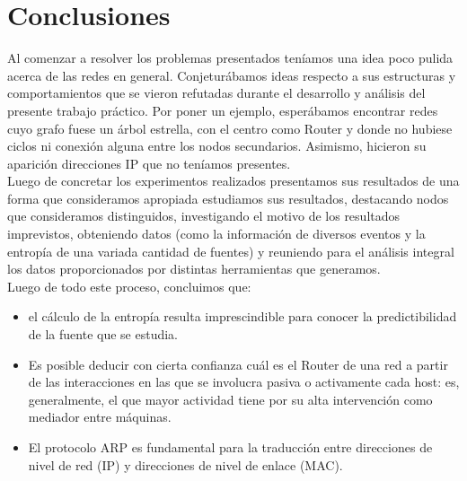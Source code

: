 \section{Conclusiones}

Al comenzar a resolver los problemas presentados ten\'iamos una idea poco pulida acerca de las redes en general. Conjetur\'abamos ideas respecto a sus estructuras y comportamientos que se vieron refutadas durante el desarrollo y an\'alisis del presente trabajo pr\'actico. Por poner un ejemplo, esper\'abamos encontrar redes cuyo grafo fuese un \'arbol estrella, con el centro como Router y donde no hubiese ciclos ni conexi\'on alguna entre los nodos secundarios. Asimismo, hicieron su aparici\'on direcciones IP que no ten\'iamos presentes.\\
Luego de concretar los experimentos realizados presentamos sus resultados de una forma que consideramos apropiada estudiamos sus resultados, destacando nodos que consideramos distinguidos, investigando el motivo de los resultados imprevistos, obteniendo datos (como la informaci\'on de diversos eventos y la entrop\'ia de una variada cantidad de fuentes) y reuniendo para el an\'alisis integral los datos proporcionados por distintas herramientas que generamos.\\
Luego de todo este proceso, concluimos que:
\begin{itemize}
	\item el c\'alculo de la entrop\'ia resulta imprescindible para conocer la predictibilidad de la fuente que se estudia. 
	\item Es posible deducir con cierta confianza cu\'al es el Router de una red a partir de las interacciones en las que se involucra pasiva o activamente cada host: es, generalmente, el que mayor actividad tiene por su alta intervenci\'on como mediador entre m\'aquinas.
    \item El protocolo ARP es fundamental para la traducci\'on entre direcciones de nivel de red (IP) y direcciones de nivel de enlace (MAC).  
\end{itemize}
